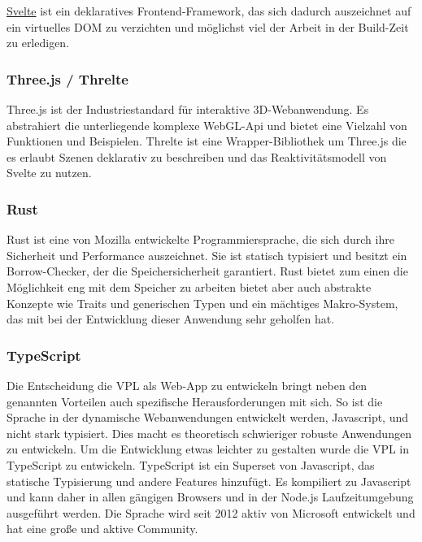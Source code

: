 \documentclass[ngerman]{article}
\begin{document}
\href{https://svelte.dev/}{Svelte} ist ein deklaratives Frontend-Framework, das sich dadurch auszeichnet auf ein virtuelles DOM zu verzichten und möglichst viel der Arbeit in der Build-Zeit zu erledigen.

\subsubsection{Three.js / Threlte}

Three.js ist der Industriestandard für interaktive 3D-Webanwendung. Es abstrahiert die unterliegende komplexe WebGL-Api und bietet eine Vielzahl von Funktionen und Beispielen. Threlte ist eine Wrapper-Bibliothek um Three.js die es erlaubt Szenen deklarativ zu beschreiben und das Reaktivitätsmodell von Svelte zu nutzen.

\subsubsection{Rust}
\label{sec:Rust}

Rust ist eine von Mozilla entwickelte Programmiersprache, die sich durch ihre Sicherheit und Performance auszeichnet. Sie ist statisch typisiert und besitzt ein Borrow-Checker, der die Speichersicherheit garantiert. \cite{Jung_2020} Rust bietet zum einen die Möglichkeit eng mit dem Speicher zu arbeiten bietet aber auch abstrakte Konzepte wie Traits und generischen Typen und ein mächtiges Makro-System, das mit bei der Entwicklung dieser Anwendung sehr geholfen hat.

\subsubsection{TypeScript}
\label{sec:TypeScript}
Die Entscheidung die VPL als Web-App zu entwickeln bringt neben den genannten Vorteilen auch spezifische Herausforderungen mit sich.
So ist die Sprache in der dynamische Webanwendungen entwickelt werden, Javascript,  und nicht stark typisiert. 
Dies macht es theoretisch schwieriger robuste Anwendungen zu entwickeln. 
Um die Entwicklung etwas leichter zu gestalten wurde die VPL in TypeScript zu entwickeln.
TypeScript ist ein Superset von Javascript, das statische Typisierung und andere Features hinzufügt. Es kompiliert zu Javascript und kann daher in allen gängigen Browsers und in der Node.js Laufzeitumgebung ausgeführt werden. Die Sprache wird seit 2012 aktiv von Microsoft entwickelt und hat eine große und aktive Community.

\pagebreak
\end{document}
